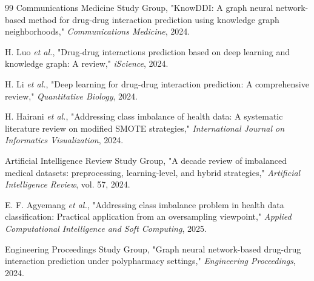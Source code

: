 \documentclass[conference]{Template/IEEEtran}
\begin{document}
\begin{thebibliography}{99}
Communications Medicine Study Group,
"KnowDDI: A graph neural network-based method for drug-drug interaction prediction using knowledge graph neighborhoods," \textit{Communications Medicine}, 2024.

H. Luo \textit{et al.},
"Drug-drug interactions prediction based on deep learning and knowledge graph: A review," \textit{iScience}, 2024.

H. Li \textit{et al.},
"Deep learning for drug-drug interaction prediction: A comprehensive review," \textit{Quantitative Biology}, 2024.

H. Hairani \textit{et al.},
"Addressing class imbalance of health data: A systematic literature review on modified SMOTE strategies," \textit{International Journal on Informatics Visualization}, 2024.

Artificial Intelligence Review Study Group,
"A decade review of imbalanced medical datasets: preprocessing, learning-level, and hybrid strategies," \textit{Artificial Intelligence Review}, vol. 57, 2024.

E. F. Agyemang \textit{et al.},
"Addressing class imbalance problem in health data classification: Practical application from an oversampling viewpoint," \textit{Applied Computational Intelligence and Soft Computing}, 2025.

Engineering Proceedings Study Group,
"Graph neural network-based drug-drug interaction prediction under polypharmacy settings," \textit{Engineering Proceedings}, 2024.

\end{thebibliography}
\end{document}
